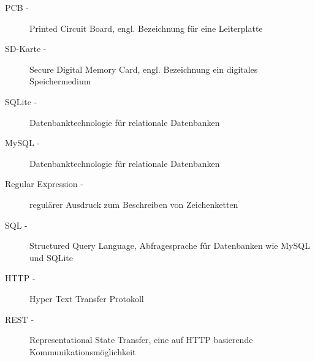 \begin{description}
                \item[PCB -] Printed Circuit Board, engl. Bezeichnung für eine Leiterplatte
                \item[SD-Karte -] Secure Digital Memory Card, engl. Bezeichnung ein digitales Speichermedium
                \item[SQLite -] Datenbanktechnologie für relationale Datenbanken
                \item[MySQL -] Datenbanktechnologie für relationale Datenbanken
                \item[Regular Expression -] regulärer Ausdruck zum Beschreiben von Zeichenketten
                \item[SQL -] Structured Query Language, Abfragesprache für Datenbanken wie MySQL und SQLite
                \item[HTTP -] Hyper Text Transfer Protokoll
                \item[REST -] Representational State Transfer, eine auf HTTP basierende Kommunikationsmöglichkeit
			\end{description}